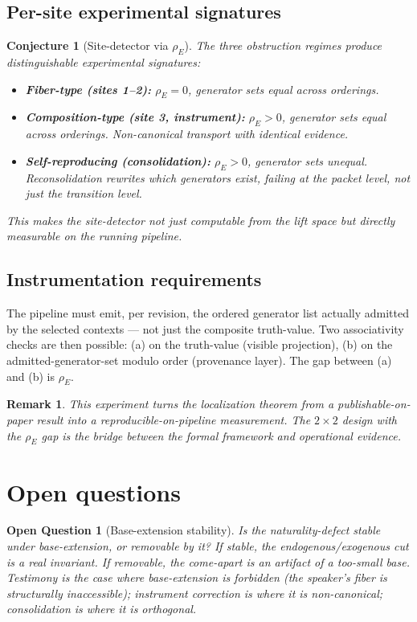 \documentclass[11pt]{article}
\newtheorem{conjecture}{Conjecture}
\newtheorem{remark}{Remark}
\newtheorem{openquestion}{Open Question}
\begin{document}
\subsection{Per-site experimental signatures}

\begin{conjecture}[Site-detector via $\rho_E$]
\label{conj:site-detector}
The three obstruction regimes produce distinguishable experimental signatures:
\begin{itemize}
  \item \textbf{Fiber-type (sites 1--2):} $\rho_E = 0$, generator sets equal across orderings.
  \item \textbf{Composition-type (site 3, instrument):} $\rho_E > 0$, generator sets equal across
  orderings. Non-canonical transport with identical evidence.
  \item \textbf{Self-reproducing (consolidation):} $\rho_E > 0$, generator sets \emph{unequal}.
  Reconsolidation rewrites which generators exist, failing at the packet level, not just the
  transition level.
\end{itemize}
This makes the site-detector not just computable from the lift space but directly measurable
on the running pipeline.
\end{conjecture}

\subsection{Instrumentation requirements}

The pipeline must emit, per revision, the ordered generator list actually admitted by the
selected contexts --- not just the composite truth-value. Two associativity checks are then
possible: (a) on the truth-value (visible projection), (b) on the admitted-generator-set
modulo order (provenance layer). The gap between (a) and (b) is $\rho_E$.

\begin{remark}
This experiment turns the localization theorem from a publishable-on-paper result into a
reproducible-on-pipeline measurement. The $2 \times 2$ design with the $\rho_E$ gap is the
bridge between the formal framework and operational evidence.
\end{remark}

\section{Open questions}

\begin{openquestion}[Base-extension stability]
\label{oq:base-extension}
Is the naturality-defect stable under base-extension, or removable by it? If stable, the
endogenous/exogenous cut is a real invariant. If removable, the come-apart is an artifact of
a too-small base. Testimony is the case where base-extension is forbidden (the speaker's fiber
is structurally inaccessible); instrument correction is where it is non-canonical; consolidation
is where it is orthogonal.
\end{openquestion}
\end{document}
